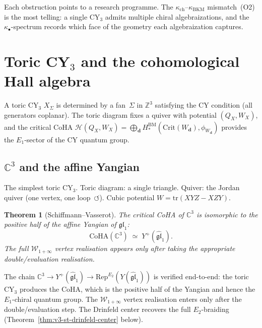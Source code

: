 \documentclass[11pt]{article}
\theoremstyle{plain}
\newtheorem{theorem}{Theorem}[section]
\theoremstyle{definition}
\theoremstyle{remark}
\newcommand{\fgl}{\mathfrak{gl}}
\newcommand{\cH}{\mathcal{H}}
\newcommand{\cW}{\mathcal{W}}
\newcommand{\bC}{\mathbb{C}}
\newcommand{\bZ}{\mathbb{Z}}
\newcommand{\Eone}{E_1}
\newcommand{\Etwo}{E_2}
\newcommand{\CoHA}{\mathrm{CoHA}}
\newcommand{\Rep}{\mathrm{Rep}}
\begin{document}
Each obstruction points to a research programme.  The
$\kappa_{\mathrm{ch}}$--$\kappa_{\mathrm{BKM}}$ mismatch~(O2) is
the most telling: a single CY$_3$ admits multiple chiral
algebraizations, and the $\kappa_\bullet$-spectrum records which
face of the geometry each algebraization captures.



\section{Toric CY$_3$ and the cohomological Hall algebra}
\label{sec:toric}

A toric CY$_3$ $X_\Sigma$ is determined by a fan~$\Sigma$ in
$\bZ^3$ satisfying the CY condition (all generators coplanar).
The toric diagram fixes a quiver with potential $(Q_X, W_X)$, and
the critical CoHA
$\cH(Q_X, W_X) = \bigoplus_\mathbf{d}
H^{\mathrm{BM}}_*(\mathrm{Crit}(W_\mathbf{d}),
\phi_{W_\mathbf{d}})$ provides the $\Eone$-sector of the CY
quantum group.

\subsection{$\bC^3$ and the affine Yangian}

The simplest toric CY$_3$.  Toric diagram: a single triangle.
Quiver: the Jordan quiver (one vertex, one loop~$\circlearrowleft$).
Cubic potential $W = \mathrm{tr}(XYZ - XZY)$.

\begin{theorem}[Schiffmann--Vasserot]
\label{thm:v3-st-sv}
The critical CoHA of $\bC^3$ is isomorphic to the positive half of
the affine Yangian of $\fgl_1$:
\[
 \CoHA(\bC^3) \;\simeq\; Y^+(\widehat{\fgl}_1).
\]
The full $\cW_{1+\infty}$ vertex realisation appears only after
taking the appropriate double/evaluation realisation.
\end{theorem}

The chain $\bC^3 \to Y^+(\widehat{\fgl}_1) \to
\Rep^{\Etwo}(Y(\widehat{\fgl}_1))$ is verified end-to-end: the
toric CY$_3$ produces the CoHA, which is the positive half of the
Yangian and hence the $\Eone$-chiral quantum group.  The
$\cW_{1+\infty}$ vertex realisation enters only after the
double/evaluation step.  The Drinfeld center recovers the full
$\Etwo$-braiding
(Theorem~\ref{thm:v3-st-drinfeld-center} below).
\end{document}
